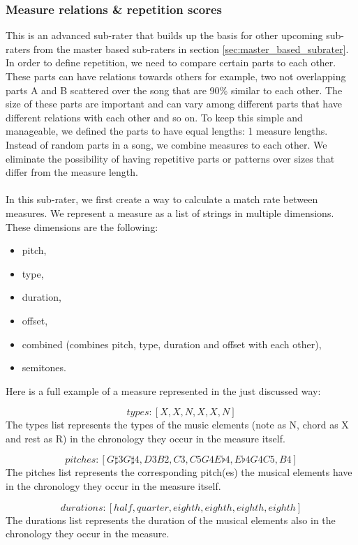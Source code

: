 \documentclass[a4paper]{article}
\begin{document}
\subsubsection{Measure relations \& repetition scores} \label{sec:measure_rel}
This is an advanced sub-rater that builds up the basis for other upcoming sub-raters from the master based sub-raters in section \ref{sec:master_based_subrater}. In order to define repetition, we need to compare certain parts to each other. These parts can have relations towards others for example, two not overlapping parts A and B scattered over the song that are 90\% similar to each other. The size of these parts are important and can vary among different parts that have different relations with each other and so on. To keep this simple and manageable, we defined the parts to have equal lengths: 1 measure lengths. Instead of random parts in a song, we combine measures to each other. We eliminate the possibility of having repetitive parts or patterns over sizes that differ from the measure length.
\\\\
In this sub-rater, we first create a way to calculate a match rate between measures. We represent a measure as a list of strings in multiple dimensions. These dimensions are the following:
\begin{itemize}
	\item pitch,
	\item type,
	\item duration,
	\item offset,
	\item combined (combines pitch, type, duration and offset with each other),
	\item semitones.
\end{itemize}
Here is a full example of a measure represented in the just discussed way:

\[ types: [X, X, N, X, X, N] \]
The types list represents the types of the music elements (note as N, chord as X and rest as R) in the chronology they occur in the measure itself.

\[pitches: [G\sharp3G\sharp4, D3B2, C3, C5G4E\flat4, E\flat4G4C5, B4]\]
The pitches list represents the corresponding pitch(es) the musical elements have in the chronology they occur in the measure itself.

\[durations: [half, quarter, eighth, eighth, eighth, eighth] \]
The durations list represents the duration of the musical elements also in the chronology they occur in the measure.
\end{document}

